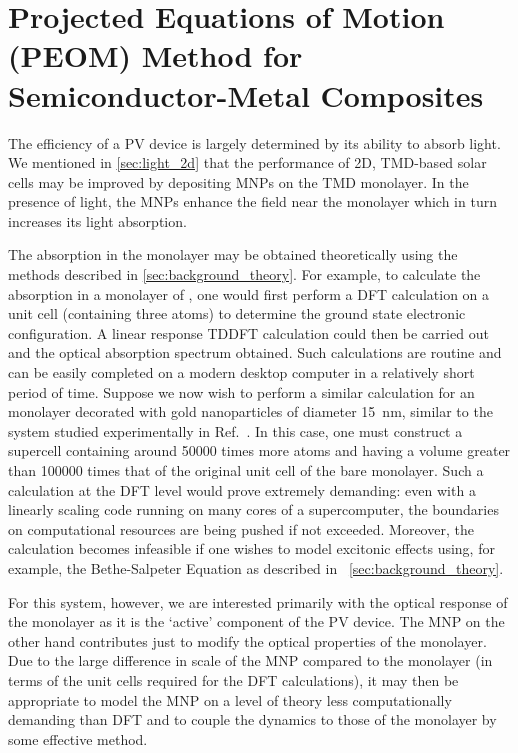 \section{Projected Equations of Motion (PEOM) Method for\\ {Semiconductor-Metal} Composites}\label{sec:peom}

The efficiency of a PV device is largely determined by its ability to absorb
light. We mentioned in \cref{sec:light_2d} that the performance of 2D,
TMD-based solar cells may be improved by depositing MNPs on the TMD monolayer.
In the presence of light, the MNPs enhance the field near the monolayer which
in turn increases its light absorption.

The absorption in the monolayer may be obtained theoretically using the methods
described in \cref{sec:background_theory}. For example, to calculate the
absorption in a monolayer of , one would first perform a DFT calculation on
a unit cell (containing three atoms) to determine the ground state electronic
configuration. A linear response TDDFT calculation could then be carried out
and the optical absorption spectrum obtained. Such calculations are routine and
can be easily completed on a modern desktop computer in a relatively short
period of time. Suppose we now wish to perform a similar calculation for an
 monolayer decorated with gold nanoparticles of diameter
\SI{15}{\nano\metre}, similar to the system studied experimentally in
Ref.~\cite{Lin2013}. In this case, one
must construct a supercell containing around \num{50000} times more atoms and
having a volume greater than \num{100000} times that of the original unit
cell of the bare  monolayer. Such a calculation at the DFT level would
prove extremely demanding: even with a
linearly scaling code running on many cores of a supercomputer, the
boundaries on computational resources are being pushed if not exceeded.
Moreover, the calculation becomes infeasible if one
wishes to model excitonic effects using, for example, the Bethe-Salpeter
Equation as described in
~\cref{sec:background_theory}.

For this system, however, we are interested primarily with the optical response
of the  monolayer as it is the `active' component of the PV device. The MNP
on the other hand contributes just to modify the optical properties of the
monolayer. Due to the large difference in scale of the MNP compared to the
monolayer (in terms of the unit cells required for the DFT calculations), it
may then be appropriate to model the MNP on a level of theory less
computationally demanding than DFT and to couple the dynamics to those of the
monolayer by some effective method. 

